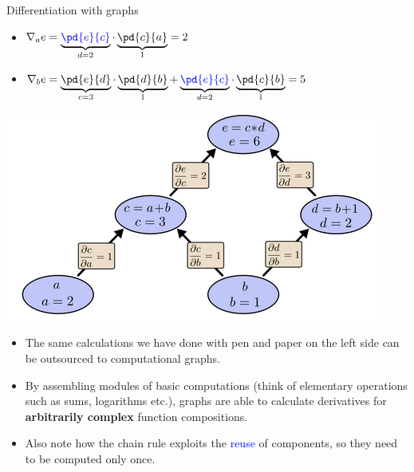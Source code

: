 \begin{vbframe}{Differentiation with graphs}
\vspace{0.3cm}

\begin{minipage}{0.45\textwidth}
  \begin{itemize}
    \scriptsize
    \item $\nabla_a e = \underbrace{\textcolor{blue}{\pd{e}{c}}}_{d = 2} \cdot 
    \underbrace{\pd{c}{a}}_{1} = 2$
    \item $\nabla_b e = \underbrace{\pd{e}{d}}_{c = 3} \cdot 
    \underbrace{\pd{d}{b}}_{1} + \underbrace{\textcolor{blue}{\pd{e}{c}}}_{d = 2} 
    \cdot \underbrace{\pd{c}{b}}_{1} = 5$
  \end{itemize}
\end{minipage}%
\begin{minipage}{0.05\textwidth}
\phantom{foo}
\end{minipage}%
\begin{minipage}{0.5\textwidth}
\includegraphics[width=\textwidth]{figure_man/compgraph_example_2}
\end{minipage}

\vspace{0.3cm}

\begin{itemize} 
  \footnotesize
  \item The same calculations we have done with pen and paper on the left side 
  can be outsourced to computational graphs.
  \item By assembling modules of basic computations (think of elementary 
  operations such as sums, logarithms etc.), graphs are able to 
  calculate derivatives for \textbf{arbitrarily complex} function compositions.
  \item Also note how the chain rule exploits the \textcolor{blue}{reuse} of
  components, so they need to be computed only once.
\end{itemize}

\end{vbframe}

